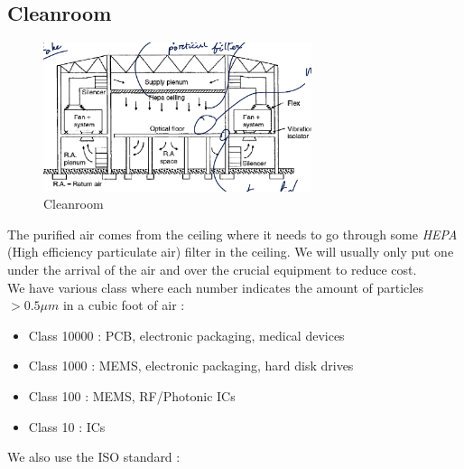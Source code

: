 \documentclass[
]{article}
\begin{document}
\hypertarget{cleanroom}{%
\subsection{Cleanroom}\label{cleanroom}}

\begin{figure}
\hypertarget{fig:cleanroom-label}{%
\centering
\includegraphics[width=0.7\textwidth,height=\textheight]{cleanroom.png}
\caption{Cleanroom}\label{fig:cleanroom-label}
}
\end{figure}

The purified air comes from the ceiling where it needs to go through
some \emph{HEPA} (High efficiency particulate air) filter in the
ceiling. We will usually only put one under the arrival of the air and
over the crucial equipment to reduce cost.\\
We have various class where each number indicates the amount of
particles \(>0.5\mu m\) in a cubic foot of air :

\begin{itemize}
\item
  Class 10000 : PCB, electronic packaging, medical devices
\item
  Class 1000 : MEMS, electronic packaging, hard disk drives
\item
  Class 100 : MEMS, RF/Photonic ICs
\item
  Class 10 : ICs
\end{itemize}

We also use the ISO standard :
\end{document}

